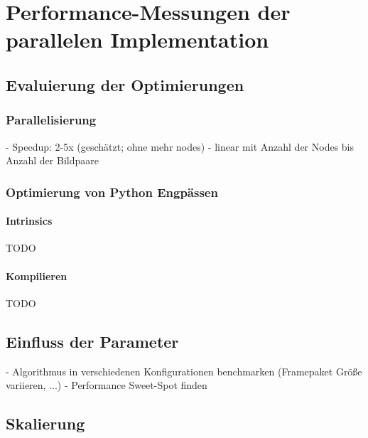 \chapter{Performance-Messungen der parallelen Implementation}

\section{Evaluierung der Optimierungen}

\subsection{Parallelisierung}

\begin{correctmore}
	- Speedup: 2-5x (geschätzt; ohne mehr nodes)
	- linear mit Anzahl der Nodes bis Anzahl der Bildpaare
\end{correctmore}

\subsection{Optimierung von Python Engpässen}

\subsubsection{Intrinsics}

\begin{correctmore}
	TODO
\end{correctmore}

\subsubsection{Kompilieren}

\begin{correctmore}
TODO
\end{correctmore}

\section{Einfluss der Parameter}

\begin{correctmore}
	- Algorithmus in verschiedenen Konfigurationen benchmarken (Framepaket Größe variieren, ...)
	- Performance Sweet-Spot finden
\end{correctmore}

\section{Skalierung}


